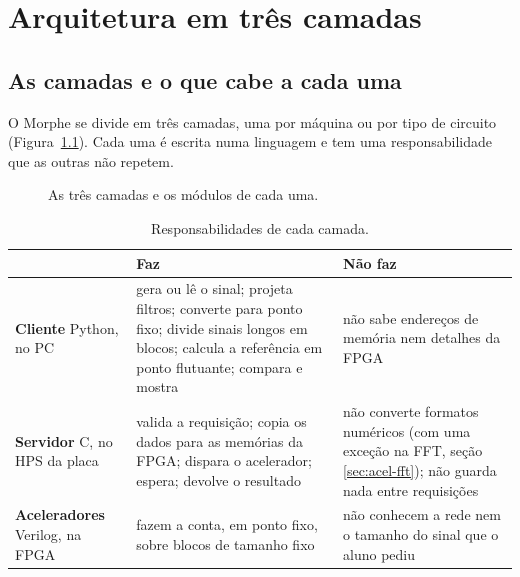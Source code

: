 \chapter{Arquitetura em três camadas}
\label{cap:arquitetura}

\section{As camadas e o que cabe a cada uma}

O Morphe se divide em três camadas, uma por máquina ou por tipo de circuito
(Figura~\ref{fig:camadas}). Cada uma é escrita numa linguagem e tem uma
responsabilidade que as outras não repetem.

\begin{figure}[htbp]
  \centering
  \caption{As três camadas e os módulos de cada uma.}
  \label{fig:camadas}
\end{figure}

\begin{table}[htbp]
  \centering
  \small
  \caption{Responsabilidades de cada camada.}
  \label{tab:camadas}
  \begin{tabularx}{\textwidth}{@{}>{\raggedright\arraybackslash}p{2.7cm}XX@{}}
    \toprule
    & \textbf{Faz} & \textbf{Não faz} \\
    \midrule
    \textbf{Cliente} \newline \footnotesize Python, no PC
      & gera ou lê o sinal; projeta filtros; converte para ponto fixo; divide
        sinais longos em blocos; calcula a referência em ponto flutuante;
        compara e mostra
      & não sabe endereços de memória nem detalhes da FPGA \\
    \addlinespace
    \textbf{Servidor} \newline \footnotesize C, no HPS da placa
      & valida a requisição; copia os dados para as memórias da FPGA; dispara o
        acelerador; espera; devolve o resultado
      & não converte formatos numéricos (com uma exceção na FFT, seção
        \ref{sec:acel-fft}); não guarda nada entre requisições \\
    \addlinespace
    \textbf{Aceleradores} \newline \footnotesize Verilog, na FPGA
      & fazem a conta, em ponto fixo, sobre blocos de tamanho fixo
      & não conhecem a rede nem o tamanho do sinal que o aluno pediu \\
    \bottomrule
  \end{tabularx}
\end{table}

